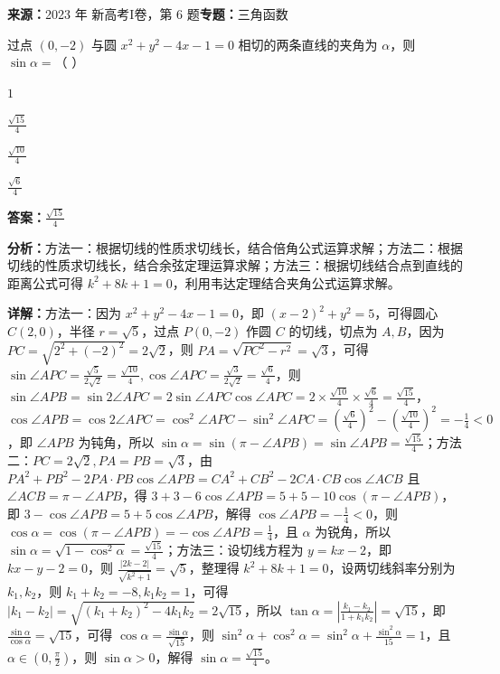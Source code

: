 \begin{question}[points=5]
\textbf{来源：}2023 年 新高考I卷，第 6 题\quad \textbf{专题：}三角函数\par
过点 $(0,-2)$ 与圆 $x^2+y^2-4x-1=0$ 相切的两条直线的夹角为 $\alpha$，则 $\sin\alpha=$（ ）
\begin{choices}
  \item $1$
  \item $\frac{\sqrt{15}}{4}$
  \item $\frac{\sqrt{10}}{4}$
  \item $\frac{\sqrt{6}}{4}$
\end{choices}
\begin{solution}
\textbf{答案：}$\frac{\sqrt{15}}{4}$

\textbf{分析：}方法一：根据切线的性质求切线长，结合倍角公式运算求解；方法二：根据切线的性质求切线长，结合余弦定理运算求解；方法三：根据切线结合点到直线的距离公式可得 $k^2+8k+1=0$，利用韦达定理结合夹角公式运算求解。

\textbf{详解：}方法一：因为 $x^2+y^2-4x-1=0$，即 $(x-2)^2+y^2=5$，可得圆心 $C(2,0)$，半径 $r=\sqrt{5}$，过点 $P(0,-2)$ 作圆 $C$ 的切线，切点为 $A,B$，因为 $PC=\sqrt{2^2+(-2)^2}=2\sqrt{2}$，则 $PA=\sqrt{PC^2-r^2}=\sqrt{3}$，可得 $\sin\angle APC=\frac{\sqrt{5}}{2\sqrt{2}}=\frac{\sqrt{10}}{4}, \cos\angle APC=\frac{\sqrt{3}}{2\sqrt{2}}=\frac{\sqrt{6}}{4}$，则 $\sin\angle APB=\sin 2\angle APC=2\sin\angle APC\cos\angle APC=2\times\frac{\sqrt{10}}{4}\times\frac{\sqrt{6}}{4}=\frac{\sqrt{15}}{4}$，$\cos\angle APB=\cos 2\angle APC=\cos^2\angle APC-\sin^2\angle APC=\left(\frac{\sqrt{6}}{4}\right)^2-\left(\frac{\sqrt{10}}{4}\right)^2=-\frac{1}{4}<0$，即 $\angle APB$ 为钝角，所以 $\sin\alpha=\sin(\pi-\angle APB)=\sin\angle APB=\frac{\sqrt{15}}{4}$；方法二：$PC=2\sqrt{2}, PA=PB=\sqrt{3}$，由 $PA^2+PB^2-2PA\cdot PB\cos\angle APB=CA^2+CB^2-2CA\cdot CB\cos\angle ACB$ 且 $\angle ACB=\pi-\angle APB$，得 $3+3-6\cos\angle APB=5+5-10\cos(\pi-\angle APB)$，即 $3-\cos\angle APB=5+5\cos\angle APB$，解得 $\cos\angle APB=-\frac{1}{4}<0$，则 $\cos\alpha=\cos(\pi-\angle APB)=-\cos\angle APB=\frac{1}{4}$，且 $\alpha$ 为锐角，所以 $\sin\alpha=\sqrt{1-\cos^2\alpha}=\frac{\sqrt{15}}{4}$；方法三：设切线方程为 $y=kx-2$，即 $kx-y-2=0$，则 $\frac{|2k-2|}{\sqrt{k^2+1}}=\sqrt{5}$，整理得 $k^2+8k+1=0$，设两切线斜率分别为 $k_1,k_2$，则 $k_1+k_2=-8, k_1k_2=1$，可得 $|k_1-k_2|=\sqrt{(k_1+k_2)^2-4k_1k_2}=2\sqrt{15}$，所以 $\tan\alpha=\left|\frac{k_1-k_2}{1+k_1k_2}\right|=\sqrt{15}$，即 $\frac{\sin\alpha}{\cos\alpha}=\sqrt{15}$，可得 $\cos\alpha=\frac{\sin\alpha}{\sqrt{15}}$，则 $\sin^2\alpha+\cos^2\alpha=\sin^2\alpha+\frac{\sin^2\alpha}{15}=1$，且 $\alpha\in(0,\frac{\pi}{2})$，则 $\sin\alpha>0$，解得 $\sin\alpha=\frac{\sqrt{15}}{4}$。
\end{solution}
\end{question}

